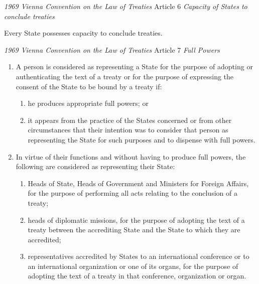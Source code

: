 \begin{conventiondetails}{\textit{1969 Vienna Convention on the Law of Treaties} Article 6}\label{VCLT Art 6}
    \textit{Capacity of States to conclude treaties}

    \vspace{\baselineskip}

    Every State possesses capacity to conclude treaties. 
\end{conventiondetails}

\begin{conventiondetails}{\textit{1969 Vienna Convention on the Law of Treaties} Article 7}\label{VCLT Art 7}
    \flushleft
    \textit{Full Powers}
    \begin{enumerate}
        \item A person is considered as representing a State for the purpose of adopting or authenticating the text of a treaty or for the purpose of expressing the consent of the State to be bound by a treaty if: 
        \begin{enumerate}[label=(\alph*)]
            \item he produces appropriate full powers; or 
            \item it appears from the practice of the States concerned or from other circumstances that their  intention was to consider that person as representing the State for such purposes and to dispense with full powers. 
        \end{enumerate}
        \item In virtue of their functions and without having to produce full powers, the following are  considered as representing their State:
        \begin{enumerate}[label=(\alph*)]
            \item Heads of State, Heads of Government and Ministers for Foreign Affairs, for the purpose of 
            performing all acts relating to the conclusion of a treaty; 
            \item heads of diplomatic missions, for the purpose of adopting the text of a treaty between the accrediting State and the State to which they are accredited; 
            \item representatives accredited by States to an international conference or to an international organization or one of its organs, for the purpose of adopting the text of a treaty in that conference, organization or organ. 
        \end{enumerate}
    \end{enumerate}
\end{conventiondetails}

